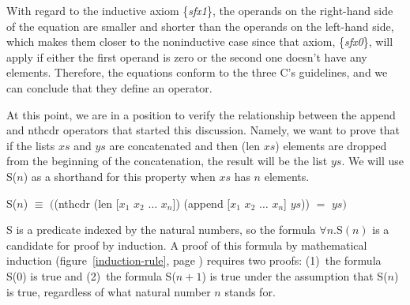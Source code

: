 With regard to the inductive axiom \{\emph{sfx1}\},
the operands on the right-hand side of the equation are
smaller and shorter than the operands on the left-hand side,
which makes them closer to the noninductive case
since that axiom, \{\emph{sfx0}\}, will apply if either the first
operand is zero or the second one doesn't have any elements.
Therefore, the equations conform to the three C's guidelines,
and we can conclude that they define an operator.

At this point, we are in a position to verify the relationship
between the \textsf{append} and \textsf{nthcdr} operators that started this discussion.
Namely, we want to prove that if the lists $xs$ and $ys$ are concatenated
and then \textsf{(len $xs$)} elements are dropped from the beginning of the
concatenation, the result will be the list $ys$.
We will use S($n$) as a shorthand for this property
when $xs$ has $n$ elements.
\begin{center}
\label{append-prefix-thm-predicate}
S($n$) $\equiv$ $($\textsf{(nthcdr (len [$x_1$ $x_2$ $\dots$ $x_n$]) (append [$x_1$ $x_2$ $\dots$ $x_n$] $ys$))} $=$ $ys)$
\end{center}
\label{append-suffix-thm-pencil-proof}
S is a predicate indexed by the natural numbers,
so the formula $\forall n.$S$(n)$ is a candidate for proof by induction.
A proof of this formula by mathematical induction
(figure~\ref{induction-rule}, page \pageref{induction-rule})
requires two proofs:
(1)~the formula S(0) is true and
(2)~the formula S($n+1$) is true under the assumption that S($n$) is true,
regardless of what natural number $n$ stands for.

